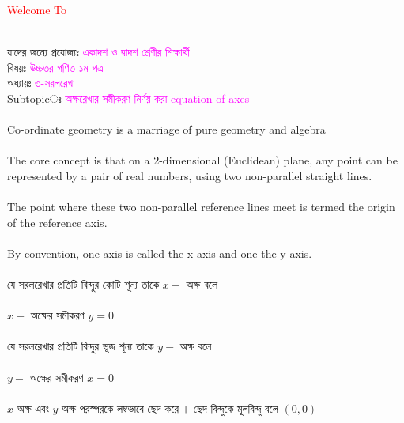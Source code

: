\documentclass{article}
\begin{document}
 
	\Large
	\textcolor{red}{Welcome To} 
	\\
	\\
	যাদের জন্যে প্রযোজ্যঃ  	\textcolor{magenta}{একাদশ ও দ্বাদশ শ্রেণীর শিক্ষার্থী} \\
	বিষয়ঃ \textcolor{magenta}{উচ্চতর গণিত ১ম পত্র} \\
	অধ্যায়ঃ \textcolor{magenta}{৩-সরলরেখা}\\ 
	Subtopicঃ  \textcolor{magenta}{ অক্ষরেখার সমীকরণ নির্ণয় করা equation of axes }\\
	\\
Co-ordinate geometry is a marriage of pure geometry and algebra\\
\\
 The core concept is that on a 2-dimensional (Euclidean) plane, any point can be represented by a pair of real numbers, using two non-parallel straight lines. \\
 \\
 The point where these two non-parallel reference lines meet is termed the origin of the reference axis.\\
 \\
  By convention, one axis is called the x-axis and one the y-axis.\\
\\
যে সরলরেখার প্রতিটি বিন্দুর কোটি  শূন্য তাকে $x-$ অক্ষ বলে \\
\\
 $x-$ অক্ষের সমীকরণ $y=0$\\
 \\
 যে সরলরেখার প্রতিটি বিন্দুর ভূজ  শূন্য তাকে $y-$ অক্ষ বলে \\
 \\
 $y-$ অক্ষের সমীকরণ $x=0$\\
 \\
 $x$ অক্ষ এবং  $y$ অক্ষ পরস্পরকে লম্বভাবে ছেদ করে । ছেদ বিন্দুকে মূলবিন্দু বলে $(0,0)$ \\
 \\ 
\end{document}
